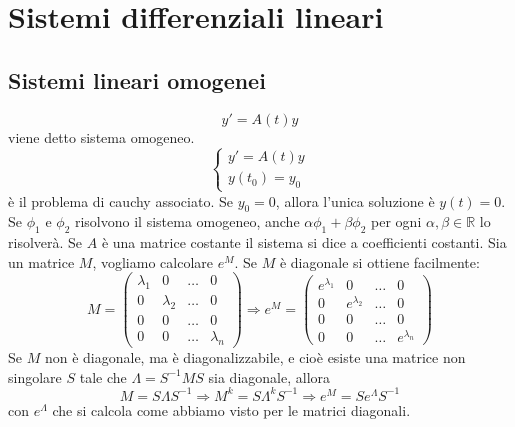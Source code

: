 \section{Sistemi differenziali lineari}
\subsection{Sistemi lineari omogenei}
\[
    y' = A(t) y
\]
viene detto sistema omogeneo.\newline
\[
    \begin{cases}
        y' = A(t) y\\
        y(t_0) = y_0
    \end{cases}
\]
è il problema di cauchy associato.\newline
\newline
Se $y_0 = 0$, allora l'unica soluzione è $y(t) = 0$.\newline
\newline
Se $\phi_1$ e $\phi_2$ risolvono il sistema omogeneo, anche $\alpha \phi_1 + \beta \phi_2$ per ogni $\alpha, \beta \in \mathbb{R}$ lo risolverà.\newline
\newline
Se $A$ è una matrice costante il sistema si dice a coefficienti costanti.\newline
\newline
Sia un matrice $M$, vogliamo calcolare $e^{M}$. \newline
Se $M$ è diagonale si ottiene facilmente:
\[
    M = \left( \begin{matrix}
        \lambda_1  & 0 &\dots & 0\\
        0 & \lambda_2 &\dots &0\\
        0 & 0 &\dots &0\\
        0 & 0 &\dots &\lambda_n
    \end{matrix} \right) \Rightarrow e^M = \left( \begin{matrix}
        e^{\lambda_1}  & 0 &\dots & 0\\
        0 & e^{\lambda_2} &\dots &0\\
        0 & 0 &\dots &0\\
        0 & 0 &\dots & e^{\lambda_n}
    \end{matrix} \right)
\]
Se $M$ non è diagonale, ma è diagonalizzabile, e cioè esiste una matrice non singolare $S$ tale che $\Lambda = S^{-1}MS$ sia diagonale, allora
\[
    M = S\Lambda S^{-1} \Rightarrow  M^k = S\Lambda^kS^{-1} \Rightarrow e^M = S e^{\Lambda}S^{-1}
\]
con $e^{\Lambda}$ che si calcola come abbiamo visto per le matrici diagonali.\newline
